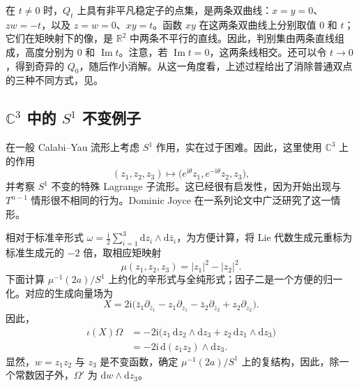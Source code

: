 在 $t\neq0$ 时，$Q_t$ 上具有非平凡稳定子的点集，是两条双曲线：$x=y=0$、$zw=-t$，以及 $z=w=0$、$xy=t$。函数 $xy$ 在这两条双曲线上分别取值 $0$ 和 $t$；它们在矩映射下的像，是 $\mathbb R^2$ 中两条不平行的直线。因此，判别集由两条直线组成，高度分别为 $0$ 和 $\operatorname{Im}t$。注意，若 $\operatorname{Im}t=0$，这两条线相交。还可以令 $t\to0$，得到奇异的 $Q_0$，随后作小消解。从这一角度看，上述过程给出了消除普通双点的三种不同方式，见。
\begin{figure}[H]
\centering
{}
\BookNumberOnlyCaption\label{fig:7.6}
\end{figure}

\subsection{\texorpdfstring{$\mathbb C^3$}{ℂ³} 中的 \texorpdfstring{$S^1$}{S¹} 不变例子}\label{sec:7.2.4}

在一般 Calabi--Yau 流形上考虑 $S^1$ 作用，实在过于困难。因此，这里使用 $\mathbb C^3$ 上的作用
\[
(z_1,z_2,z_3)\longmapsto
\bigl(e^{\mathrm i\theta}z_1,e^{-\mathrm i\theta}z_2,z_3\bigr),
\]
并考察 $S^1$ 不变的特殊 Lagrange 子流形。这已经很有启发性，因为开始出现与 $T^{n-1}$ 情形很不相同的行为。Dominic Joyce 在一系列论文中广泛研究了这一情形。

相对于标准辛形式 $\omega=\tfrac{\mathrm i}{2}\sum_{i=1}^3\mathrm dz_i\wedge\mathrm d\bar z_i$，为方便计算，将 Lie 代数生成元重标为标准生成元的 $-2$ 倍，取相应矩映射
\[
\mu(z_1,z_2,z_3)=|z_1|^2-|z_2|^2.
\]
下面计算 $\mu^{-1}(2a)/S^1$ 上约化的辛形式与全纯形式；因子二是一个方便的归一化。对应的生成向量场为
\[
X=2\mathrm i\bigl(\bar z_1\partial_{\bar z_1}-z_1\partial_{z_1}
-\bar z_2\partial_{\bar z_2}+z_2\partial_{z_2}\bigr).
\]
因此，
\[
\begin{aligned}
\iota(X)\Omega
&=-2\mathrm i\bigl(z_1\,\mathrm dz_2\wedge\mathrm dz_3
+z_2\,\mathrm dz_1\wedge\mathrm dz_3\bigr)\\
&=-2\mathrm i\,\mathrm d(z_1z_2)\wedge\mathrm dz_3.
\end{aligned}
\]
显然，$w=z_1z_2$ 与 $z_3$ 是不变函数，确定 $\mu^{-1}(2a)/S^1$ 上的复结构，因此，除一个常数因子外，$\Omega'$ 为 $\mathrm dw\wedge\mathrm dz_3$。

